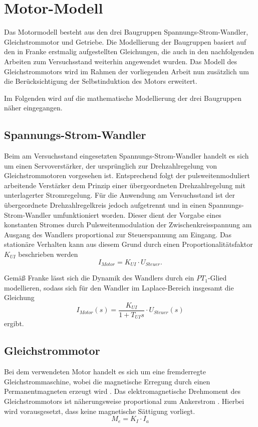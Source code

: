 \section{Motor-Modell}

Das Motormodell besteht aus den drei Baugruppen Spannungs-Strom-Wandler, Gleichstrommotor und Getriebe. Die Modellierung der Baugruppen basiert auf den in Franke \cite{franke} erstmalig aufgestellten Gleichungen, die auch in den nachfolgenden Arbeiten zum Versuchsstand weiterhin angewendet wurden. Das Modell des Gleichstrommotors wird im Rahmen der vorliegenden Arbeit nun zusätzlich um die Berücksichtigung der Selbstinduktion des Motors erweitert.

Im Folgenden wird auf die mathematische Modellierung der drei Baugruppen näher eingegangen.

\subsection{Spannungs-Strom-Wandler}

Beim am Versuchsstand eingesetzten Spannungs-Strom-Wandler handelt es sich um einen Servoverstärker, der ursprünglich zur Drehzahlregelung von Gleichstrommotoren vorgesehen ist. Entsprechend folgt der pulsweitenmoduliert arbeitende Verstärker dem Prinzip einer übergeordneten Drehzahlregelung mit unterlagerter Stromregelung. Für die Anwendung am Versuchsstand ist der übergeordnete Drehzahlregelkreis jedoch aufgetrennt und in einen Spannungs-Strom-Wandler umfunktioniert worden. Dieser dient der Vorgabe eines konstanten Stromes durch Pulsweitenmodulation der Zwischenkreisspannung am Ausgang des Wandlers proportional zur Steuerspannung am Eingang. Das stationäre Verhalten kann aus diesem Grund durch einen Proportionalitätsfaktor $K_{UI}$ beschrieben werden
	\[
	I_{Motor} = K_{UI} \cdot U_{Steuer} .
\]

Gemäß Franke \cite{franke} lässt sich die Dynamik des Wandlers durch ein $PT_1$-Glied modellieren, sodass sich für den Wandler im Laplace-Bereich insgesamt die Gleichung
	\[
	I_{Motor}(s) = \frac{K_{UI}}{1+T_{UI}s} \cdot U_{Steuer}(s)
	\]
ergibt.


\subsection{Gleichstrommotor}

Bei dem verwendeten Motor handelt es sich um eine fremderregte Gleichstrommaschine, wobei die magnetische Erregung durch einen Permanentmagneten erzeugt wird \cite{franke}. Das elektromagnetische Drehmoment des Gleichstrommotors ist näherungsweise proportional zum Ankerstrom \cite{binder}. Hierbei wird vorausgesetzt, dass keine magnetische Sättigung vorliegt.
\[
	M_e = K_I \cdot I_a
\]


